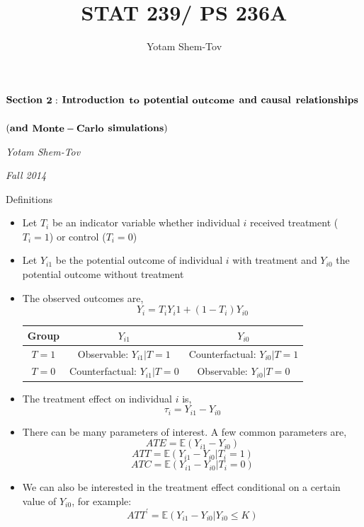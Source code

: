 \documentclass[handout]{beamer}
\author{Yotam Shem-Tov}
\title{STAT 239/ PS 236A}
\theoremstyle{definition}
\begin{document}


\begin{frame}{}

\centering

\LARGE

$\bold{Section}$ $\bold{2:}$ $\bold{Introduction}$ $\bold{to}$ $\bold{potential}$ $\bold{outcome}$ $\bold{and}$ $\bold{causal}$ $\bold{relationships}$ \\~\\
$\bold{(and}$ $\bold{Monte-Carlo}$ $\bold{simulations})$

\vspace{0.4 in}

\large
\textit{Yotam Shem-Tov}

\vspace{0.1 in}

\textit{Fall 2014}

\end{frame}



\begin{frame}{Definitions}
\begin{itemize}
\item Let $T_i$ be an indicator variable whether individual $i$ received treatment ($T_i=1$) or control ($T_i=0$)
\item Let $Y_{i1}$ be the potential outcome of individual $i$ with treatment and $Y_{i0}$ the potential outcome without treatment
\item The observed outcomes are,
$$Y_i = T_i Y_i1 +(1-T_i)Y_{i0}$$
\pause
	\small
		 \begin{tabular}{ccc}
		\hline
		Group & $Y_{i1}$ & $Y_{i0}$\\
		\hline
		 $T=1$ & Observable: $Y_{i1}|T=1$ & Counterfactual: $Y_{i0}|T=1$\\
		 $T=0$ & Counterfactual: $Y_{i1}|T=0$ & Observable: $Y_{i0}|T=0$\\
		\hline
		\end{tabular}
	\normalsize
\end{itemize}
\end{frame}

\begin{frame}
\begin{itemize}
\item The treatment effect on individual $i$ is,
$$ \tau_i = Y_{i1} - Y_{i0}$$ 
\pause
\item There can be many parameters of interest. A few common parameters are,
$$ATE = \mathbb{E}\left(Y_{i1} - Y_{i0} \right)$$
$$ATT = \mathbb{E}\left(Y_{i1} - Y_{i0}| T_i=1 \right)$$
$$ATC = \mathbb{E}\left(Y_{i1} - Y_{i0}| T_i=0 \right)$$
\pause
\item We can also be interested in the treatment effect conditional on a certain value of $Y_{i0}$, for example:
$$ATT^{'} = \mathbb{E}\left(Y_{i1} - Y_{i0}| Y_{i0}\leq K \right)$$
\end{itemize}
\end{frame}
\end{document}

